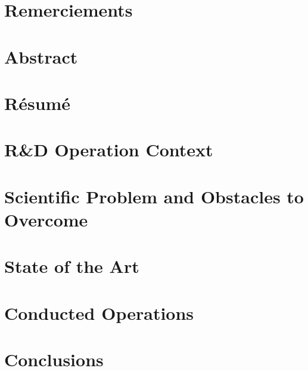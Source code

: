 \documentclass[a4paper, 12pt, oneside]{article}
\begin{document}
\color{altenNavy}



\clearpage
\section*{Remerciements}
\label{sec:remerciements}


\clearpage
\tableofcontents

\clearpage
\listoffigures
{}

\clearpage
\listoftables
{}

\clearpage
\section*{Abstract}
\label{sec:abstract}


\clearpage
\section*{R\'esum\'e}
\label{sec:resume}


\clearpage
\section{R\&D Operation Context}
\label{sec:Context}


\clearpage
\section{Scientific Problem and Obstacles to Overcome}
\label{sec:Problem}


\clearpage
\section{State of the Art}
\label{sec:SOTA}


\clearpage
\section{Conducted Operations}
\label{sec:Operations}


\clearpage
\section{Conclusions}
\label{sec:Conclusions}


\clearpage
\printbibliography[heading=bibintoc, title={Bibliography}]

\clearpage
\glsaddall{}
\printnoidxglossaries{}
\end{document}
